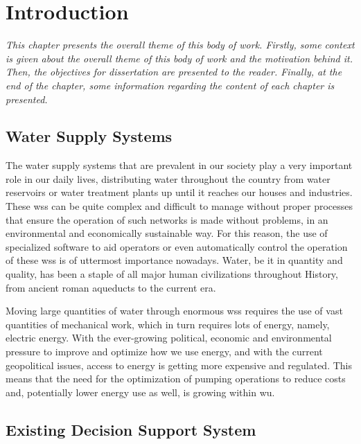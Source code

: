 \chapter{Introduction}
\label{intro}

\textit{This chapter presents the overall theme of this body of work. Firstly, some context is given about the overall theme of this body of work and the motivation behind it. Then, the objectives for dissertation are presented to the reader. Finally, at the end of the chapter, some information regarding the content of each chapter is presented.}


\section{Water Supply Systems}
\label{intro:s:water-supply-systems}

The water supply systems that are prevalent in our society play a very important role in our daily lives, distributing water throughout the country from water reservoirs or water treatment plants up until it reaches our houses and industries. These \gls{wss} can be quite complex and difficult to manage without proper processes that ensure the operation of such networks is made without problems, in an environmental and economically sustainable way. For this reason, the use of specialized software to aid operators or even automatically control the operation of these \gls{wss} is of uttermost importance nowadays. Water, be it in quantity and quality, has been a staple of all major human civilizations throughout History, from ancient roman aqueducts to the current era. 

Moving large quantities of water through enormous \gls{wss} requires the use of vast quantities of mechanical work, which in turn requires lots of energy, namely, electric energy. With the ever-growing political, economic and environmental pressure to improve and optimize how we use energy, and with the current geopolitical issues, access to energy is getting more expensive and regulated. This means that the need for the optimization of pumping operations to reduce costs and, potentially lower energy use as well, is growing within \gls{wu}.

\section{Existing Decision Support System}
\label{intro:s:existing-decision-support-system}

